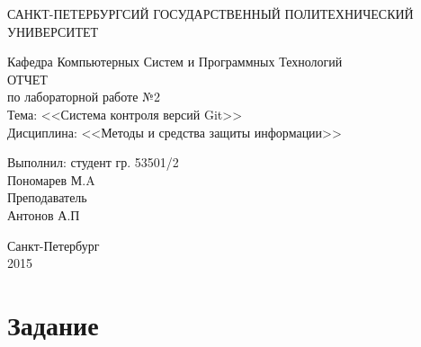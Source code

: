\documentclass[utf8x, 12pt]{G7-32}
\begin{document}
\frontmatter 


\begin{center} 

\large САНКТ-ПЕТЕРБУРГСИЙ ГОСУДАРСТВЕННЫЙ ПОЛИТЕХНИЧЕСКИЙ УНИВЕРСИТЕТ

\large Кафедра Компьютерных Систем и Программных Технологий \\[5.5cm] 

\huge ОТЧЕТ \\[0.6cm] %
\large по лабораторной работе №2\\
\large Тема: <<Система контроля версий Git>>\\
\large Дисциплина: <<Методы и средства защиты информации>>\\[3.7cm]

\end{center} 

\begin{flushright}
Выполнил: студент гр. 53501/2 \\
Пономарев М.A \\[1.2cm]


Преподаватель \\
Антонов А.П
\end{flushright}


\vfill 

\begin{center} 
\large Санкт-Петербург \\
2015
\end{center} 

\thispagestyle{empty}



\thispagestyle{empty}
\setcounter{page}{0}
\tableofcontents
\clearpage
\mainmatter


\chapter{Задание}
\end{document}
